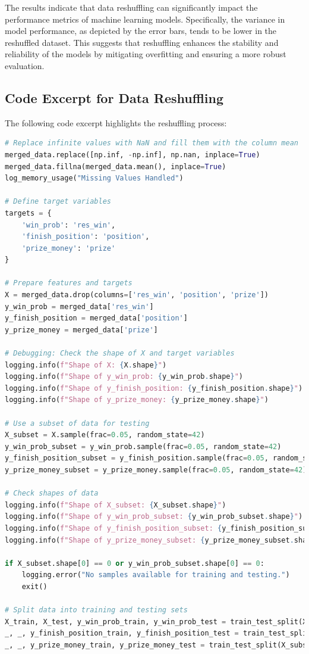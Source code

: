 \documentclass{article}
\begin{document}
The results indicate that data reshuffling can significantly impact the performance metrics of machine learning models. Specifically, the variance in model performance, as depicted by the error bars, tends to be lower in the reshuffled dataset. This suggests that reshuffling enhances the stability and reliability of the models by mitigating overfitting and ensuring a more robust evaluation.

\subsection*{Code Excerpt for Data Reshuffling}

The following code excerpt highlights the reshuffling process:

\begin{lstlisting}[language=Python, caption=Code Excerpt for Data Reshuffling]
# Replace infinite values with NaN and fill them with the column mean
merged_data.replace([np.inf, -np.inf], np.nan, inplace=True)
merged_data.fillna(merged_data.mean(), inplace=True)
log_memory_usage("Missing Values Handled")

# Define target variables
targets = {
    'win_prob': 'res_win',
    'finish_position': 'position',
    'prize_money': 'prize'
}

# Prepare features and targets
X = merged_data.drop(columns=['res_win', 'position', 'prize'])
y_win_prob = merged_data['res_win']
y_finish_position = merged_data['position']
y_prize_money = merged_data['prize']

# Debugging: Check the shape of X and target variables
logging.info(f"Shape of X: {X.shape}")
logging.info(f"Shape of y_win_prob: {y_win_prob.shape}")
logging.info(f"Shape of y_finish_position: {y_finish_position.shape}")
logging.info(f"Shape of y_prize_money: {y_prize_money.shape}")

# Use a subset of data for testing
X_subset = X.sample(frac=0.05, random_state=42)
y_win_prob_subset = y_win_prob.sample(frac=0.05, random_state=42)
y_finish_position_subset = y_finish_position.sample(frac=0.05, random_state=42)
y_prize_money_subset = y_prize_money.sample(frac=0.05, random_state=42)

# Check shapes of data
logging.info(f"Shape of X_subset: {X_subset.shape}")
logging.info(f"Shape of y_win_prob_subset: {y_win_prob_subset.shape}")
logging.info(f"Shape of y_finish_position_subset: {y_finish_position_subset.shape}")
logging.info(f"Shape of y_prize_money_subset: {y_prize_money_subset.shape}")

if X_subset.shape[0] == 0 or y_win_prob_subset.shape[0] == 0:
    logging.error("No samples available for training and testing.")
    exit()

# Split data into training and testing sets
X_train, X_test, y_win_prob_train, y_win_prob_test = train_test_split(X_subset, y_win_prob_subset, test_size=0.2, random_state=42)
_, _, y_finish_position_train, y_finish_position_test = train_test_split(X_subset, y_finish_position_subset, test_size=0.2, random_state=42)
_, _, y_prize_money_train, y_prize_money_test = train_test_split(X_subset, y_prize_money_subset, test_size=0.2, random_state=42)
\end{lstlisting}
\end{document}
